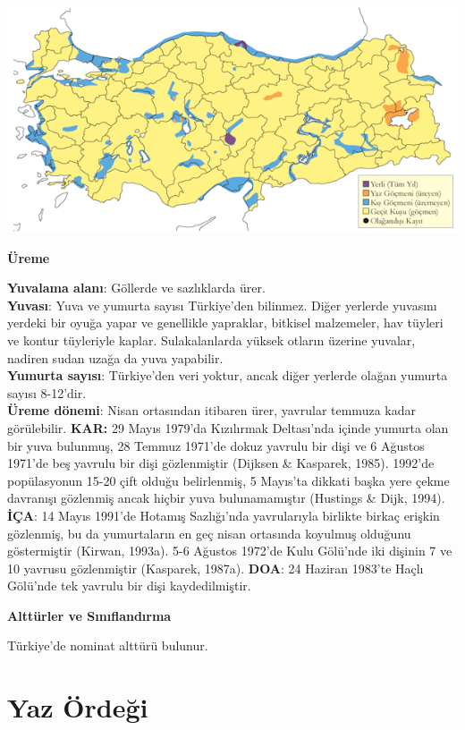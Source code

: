 \documentclass[
  a4paper,
  DIV=11,
  numbers=noendperiod]{scrreprt}
\begin{document}
\includegraphics{images/harita_Page_020.png}

\textbf{Üreme}

\textbf{Yuvalama alanı}: Göllerde ve sazlıklarda ürer.\\
\textbf{Yuvası}: Yuva ve yumurta sayısı Türkiye'den bilinmez. Diğer
yerlerde yuvasını yerdeki bir oyuğa yapar ve genellikle yapraklar,
bitkisel malzemeler, hav tüyleri ve kontur tüyleriyle kaplar.
Sulakalanlarda yüksek otların üzerine yuvalar, nadiren sudan uzağa da
yuva yapabilir.\\
\textbf{Yumurta sayısı}: Türkiye'den veri yoktur, ancak diğer yerlerde
olağan yumurta sayısı 8-12'dir.\\
\textbf{Üreme dönemi}: Nisan ortasından itibaren ürer, yavrular temmuza
kadar görülebilir. \textbf{KAR:} 29 Mayıs 1979'da Kızılırmak Deltası'nda
içinde yumurta olan bir yuva bulunmuş, 28 Temmuz 1971'de dokuz yavrulu
bir dişi ve 6 Ağustos 1971'de beş yavrulu bir dişi gözlenmiştir (Dijksen
\& Kasparek, 1985). 1992'de popülasyonun 15-20 çift olduğu belirlenmiş,
5 Mayıs'ta dikkati başka yere çekme davranışı gözlenmiş ancak hiçbir
yuva bulunamamıştır (Hustings \& Dijk, 1994). \textbf{İÇA}: 14 Mayıs
1991'de Hotamış Sazlığı'nda yavrularıyla birlikte birkaç erişkin
gözlenmiş, bu da yumurtaların en geç nisan ortasında koyulmuş olduğunu
göstermiştir (Kirwan, 1993a). 5-6 Ağustos 1972'de Kulu Gölü'nde iki
dişinin 7 ve 10 yavrusu gözlenmiştir (Kasparek, 1987a). \textbf{DOA}: 24
Haziran 1983'te Haçlı Gölü'nde tek yavrulu bir dişi kaydedilmiştir.

\textbf{Alttürler ve Sınıflandırma}

Türkiye'de nominat alttürü bulunur.

\section{Yaz Ördeği}\label{yaz-uxf6rdeux11fi}
\end{document}
